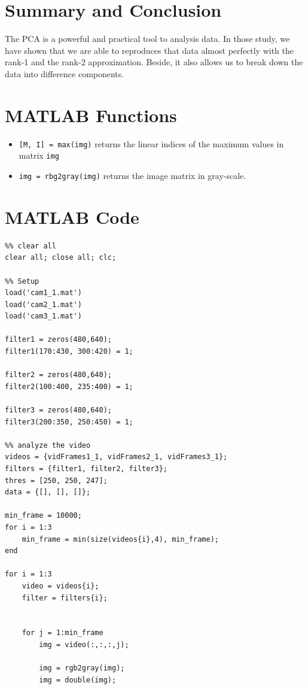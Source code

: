 \documentclass{article}
\begin{document}
\section{Summary and Conclusion}
The PCA is a powerful and practical tool to analysis data. In those study, we have shown that we are able to reproduces that data almost perfectly with the rank-1 and the rank-2 approximation. Beside, it also allows us to break down the data into difference components.

\begin{appendices}

\section{MATLAB Functions}
\begin{itemize}
    \item \texttt{[M, I] = max(img)} returns the linear indices of the 
    maximum values in matrix \texttt{img}
    \item \texttt{img = rbg2gray(img)} returns the image matrix in gray-scale.
\end{itemize}


\section{MATLAB Code}

\begin{verbatim}
%% clear all
clear all; close all; clc;

%% Setup
load('cam1_1.mat')
load('cam2_1.mat')
load('cam3_1.mat')

filter1 = zeros(480,640);
filter1(170:430, 300:420) = 1;

filter2 = zeros(480,640);
filter2(100:400, 235:400) = 1;

filter3 = zeros(480,640);
filter3(200:350, 250:450) = 1;

%% analyze the video
videos = {vidFrames1_1, vidFrames2_1, vidFrames3_1};
filters = {filter1, filter2, filter3};
thres = [250, 250, 247];
data = {[], [], []};

min_frame = 10000;
for i = 1:3
    min_frame = min(size(videos{i},4), min_frame);
end

for i = 1:3
    video = videos{i};
    filter = filters{i};
    
    
    for j = 1:min_frame
    	img = video(:,:,:,j);

        img = rgb2gray(img);
        img = double(img);
        

\end{verbatim}
\end{appendices}
\end{document}
